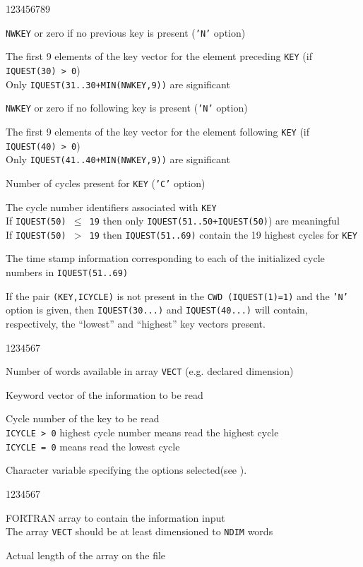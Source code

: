 \begin{DLtt}{123456789}
\item[IQUEST(30)]{\tt NWKEY} or zero if no previous key is present ({\tt'N'} option)
\item[IQUEST(31..39)\ ]The first 9 elements of the key vector for the element preceding {\tt KEY}
(if {\tt IQUEST(30) > 0}) \\
Only {\tt IQUEST(31..30+MIN(NWKEY,9))} are significant\\[3mm]
\item[IQUEST(40)]{\tt NWKEY} or zero if no following key is present ({\tt'N'} option)
\item[IQUEST(41..49)\ ]The first 9 elements of the key vector
for the element following {\tt KEY} (if {\tt IQUEST(40) > 0}) \\
Only {\tt IQUEST(41..40+MIN(NWKEY,9))} are significant \\[3mm]
\item[IQUEST(50)]Number of cycles present for {\tt KEY}
({\tt'C'} option)
\item[IQUEST(51..69)\ ]The cycle number identifiers associated with {\tt KEY}\\
If {\tt IQUEST(50) $\leq$ 19} then only {\tt IQUEST(51..50+IQUEST(50)})
are meaningful\\
If {\tt IQUEST(50) $>$ 19} then {\tt IQUEST(51..69)} contain the 19
highest cycles for {\tt KEY}
\item[IQUEST(71..89)\ ]The time stamp
information corresponding to each of the
initialized cycle numbers in {\tt IQUEST(51..69)}
\end{DLtt}
\par If the pair {\tt (KEY,ICYCLE)} is not present in the
{\tt CWD (IQUEST(1)=1)}
and the {\tt'N'} option is given, then {\tt IQUEST(30...)} and {\tt IQUEST(40...)}
will contain, respectively, the ``lowest'' and ``highest'' key vectors present.


\Idesc
\begin{DLtt}{1234567}
\item[NDIM]Number of words available in array {\tt VECT} (e.g. declared
dimension)
\item[KEY]Keyword vector of the information to be read
\item[ICYCLE]Cycle number of the key to be read\\
{\tt ICYCLE > 0} highest cycle number means read the highest cycle\\
{\tt ICYCLE = 0} means read the lowest cycle
\item[CHOPT]Character variable specifying the options selected(see ).
\end{DLtt}
\Odesc
\begin{DLtt}{1234567}
\item[VECT*]FORTRAN array to contain the information input\\
The array {\tt VECT} should be at least dimensioned to {\tt NDIM} words
\item[NFILE*]Actual length of the array on the file
\end{DLtt}

